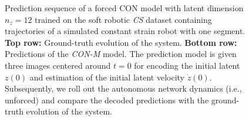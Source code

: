 \begin{figure}[hb]
    \caption{Prediction sequence of a forced \gls{CON} model with latent dimension $n_z=12$ trained on the soft robotic \emph{CS} dataset containing trajectories of a simulated constant strain robot with one segment. 
    \textbf{Top row:} Ground-truth evolution of the system. \textbf{Bottom row:} Predictions of the \emph{CON-M} model. \newline
    The prediction model is given three images centered around $t=0$ for encoding the initial latent $z(0)$ and estimation of the initial latent velocity $\dot{z}(0)$. Subsequently, we roll out the autonomous network dynamics (i.e., unforced) and compare the decoded predictions with the ground-truth evolution of the system.  
    }\label{fig:apx-con:latent_dynamics:sequence_of_stills:cs:rollout19}
\end{figure}


